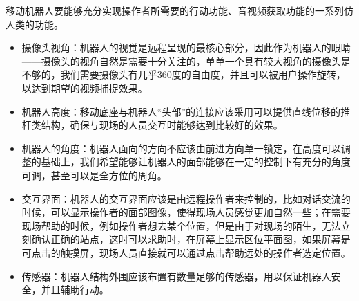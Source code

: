 移动机器人要能够充分实现操作者所需要的行动功能、音视频获取功能的一系列仿人类的功能。

\begin{itemize}
\item 摄像头视角：机器人的视觉是远程呈现的最核心部分，因此作为机器人的眼睛——摄像头的视角自然是需要十分关注的，单单一个具有较大视角的摄像头是不够的，我们需要摄像头有几乎360度的自由度，并且可以被用户操作旋转，以达到期望的视频捕捉效果。
\item 机器人高度：移动底座与机器人“头部”的连接应该采用可以提供直线位移的推杆类结构，确保与现场的人员交互时能够达到比较好的效果。
\item 
机器人的角度：机器人面向的方向不应该由前进方向单一锁定，在高度可以调整的基础上，我们希望能够让机器人的面部能够在一定的控制下有充分的角度可调，甚至可以是全方位的周角。
\item 
交互界面：机器人的交互界面应该是由远程操作者来控制的，比如对话交流的时候，可以显示操作者的面部图像，使得现场人员感觉更加自然一些；在需要现场帮助的时候，例如操作者想去某个位置，但是由于对现场的陌生，无法立刻确认正确的站点，这时可以求助时，在屏幕上显示区位平面图，如果屏幕是可点击的触摸屏，现场人员直接就可以通过点击帮助远处的操作者选定位置。
\item 
传感器：机器人结构外围应该布置有数量足够的传感器，用以保证机器人安全，并且辅助行动。
\end{itemize}

